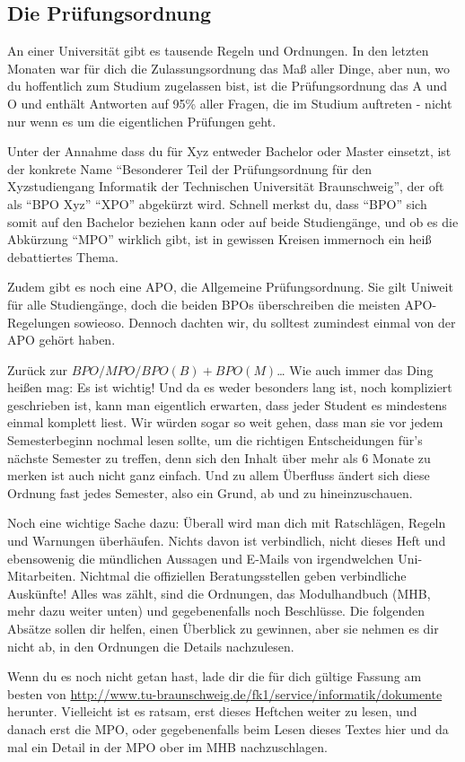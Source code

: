 \label{po}\subsection{Die Prüfungsordnung}
An einer Universität gibt es tausende Regeln und Ordnungen. In den letzten Monaten war für dich die Zulassungsordnung das Maß aller Dinge, aber nun, wo du hoffentlich zum Studium zugelassen bist, ist die Prüfungsordnung das A und O und enthält Antworten auf 95\% aller Fragen, die im Studium auftreten - nicht nur wenn es um die eigentlichen Prüfungen geht. 

Unter der Annahme dass du für Xyz entweder Bachelor oder Master einsetzt, ist der konkrete Name "`Besonderer Teil der Prüfungsordnung für den Xyzstudiengang Informatik der Technischen Universität Braunschweig"', der oft als "`BPO Xyz"' "`XPO"' abgekürzt wird. Schnell merkst du, dass "`BPO"' sich somit auf den Bachelor beziehen kann oder auf beide Studiengänge, und ob es die Abkürzung "`MPO"' wirklich gibt, ist in gewissen Kreisen immernoch ein heiß debattiertes Thema.

Zudem gibt es noch eine APO, die Allgemeine Prüfungsordnung. Sie gilt Uniweit für alle Studiengänge, doch die beiden BPOs überschreiben die meisten APO-Regelungen sowieoso. Dennoch dachten wir, du solltest zumindest einmal von der APO gehört haben.

Zurück zur $BPO/MPO/BPO(B)+BPO(M)$\ldots{} Wie auch immer das Ding heißen mag: Es ist wichtig! Und da es weder besonders lang ist, noch kompliziert geschrieben ist, kann man eigentlich erwarten, dass jeder Student es mindestens einmal komplett liest. Wir würden sogar so weit gehen, dass man sie vor jedem Semesterbeginn nochmal lesen sollte, um die richtigen Entscheidungen für's nächste Semester zu treffen, denn sich den Inhalt über mehr als 6 Monate zu merken ist auch nicht ganz einfach. Und zu allem Überfluss ändert sich diese Ordnung fast jedes Semester, also ein Grund, ab und zu hineinzuschauen.

Noch eine wichtige Sache dazu: Überall wird man dich mit Ratschlägen, Regeln und Warnungen überhäufen. Nichts davon ist verbindlich, nicht dieses Heft und ebensowenig die mündlichen Aussagen und E-Mails von irgendwelchen Uni-Mitarbeiten. Nichtmal die offiziellen Beratungsstellen geben verbindliche Auskünfte! Alles was zählt, sind die Ordnungen, das Modulhandbuch (MHB, mehr dazu weiter unten) und gegebenenfalls noch Beschlüsse. Die folgenden Absätze sollen dir helfen, einen Überblick zu gewinnen, aber sie nehmen es dir nicht ab, in den Ordnungen die Details nachzulesen.

Wenn du es noch nicht getan hast, lade dir die für dich gültige Fassung am besten von \url{http://www.tu-braunschweig.de/fk1/service/informatik/dokumente} herunter. Vielleicht ist es ratsam, erst dieses Heftchen weiter zu lesen, und danach erst die MPO, oder gegebenenfalls beim Lesen dieses Textes hier und da mal ein Detail in der MPO ober im MHB nachzuschlagen.

